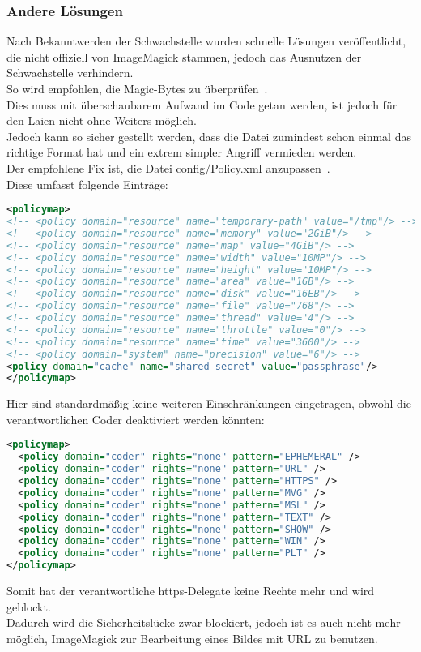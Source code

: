 
\subsubsection{Andere Lösungen}

Nach Bekanntwerden der Schwachstelle wurden schnelle Lösungen veröffentlicht, die nicht offiziell von ImageMagick stammen, jedoch das Ausnutzen der Schwachstelle verhindern.\\

So wird empfohlen, die Magic-Bytes zu überprüfen~\cite{ImageTragick}.\\
Dies muss mit überschaubarem Aufwand im Code getan werden, ist jedoch für den Laien nicht ohne Weiters möglich.\\
Jedoch kann so sicher gestellt werden, dass die Datei zumindest schon einmal das richtige Format hat und ein extrem simpler Angriff vermieden werden.\\

Der empfohlene Fix ist,  die Datei config/Policy.xml anzupassen~\cite{ImageTragick}.\\
Diese umfasst folgende Einträge:

\begin{lstlisting}[firstnumber=47, language=XML, caption=config/Policy.xml Inhalt,label={lst:lstlisting}]
<policymap>
<!-- <policy domain="resource" name="temporary-path" value="/tmp"/> -->
<!-- <policy domain="resource" name="memory" value="2GiB"/> -->
<!-- <policy domain="resource" name="map" value="4GiB"/> -->
<!-- <policy domain="resource" name="width" value="10MP"/> -->
<!-- <policy domain="resource" name="height" value="10MP"/> -->
<!-- <policy domain="resource" name="area" value="1GB"/> -->
<!-- <policy domain="resource" name="disk" value="16EB"/> -->
<!-- <policy domain="resource" name="file" value="768"/> -->
<!-- <policy domain="resource" name="thread" value="4"/> -->
<!-- <policy domain="resource" name="throttle" value="0"/> -->
<!-- <policy domain="resource" name="time" value="3600"/> -->
<!-- <policy domain="system" name="precision" value="6"/> -->
<policy domain="cache" name="shared-secret" value="passphrase"/>
</policymap>
\end{lstlisting}

Hier sind standardmäßig keine weiteren Einschränkungen eingetragen, obwohl die verantwortlichen Coder deaktiviert werden könnten:\\

\begin{lstlisting}[language=XML, caption=config/Policy.xml Inhalt,label={lst:lstlisting}]
<policymap>
  <policy domain="coder" rights="none" pattern="EPHEMERAL" />
  <policy domain="coder" rights="none" pattern="URL" />
  <policy domain="coder" rights="none" pattern="HTTPS" />
  <policy domain="coder" rights="none" pattern="MVG" />
  <policy domain="coder" rights="none" pattern="MSL" />
  <policy domain="coder" rights="none" pattern="TEXT" />
  <policy domain="coder" rights="none" pattern="SHOW" />
  <policy domain="coder" rights="none" pattern="WIN" />
  <policy domain="coder" rights="none" pattern="PLT" />
</policymap>
\end{lstlisting}

Somit hat der verantwortliche https-Delegate keine Rechte mehr und wird geblockt.\\
Dadurch wird die Sicherheitslücke zwar blockiert, jedoch ist es auch nicht mehr möglich, ImageMagick zur Bearbeitung eines Bildes mit URL zu benutzen.\\